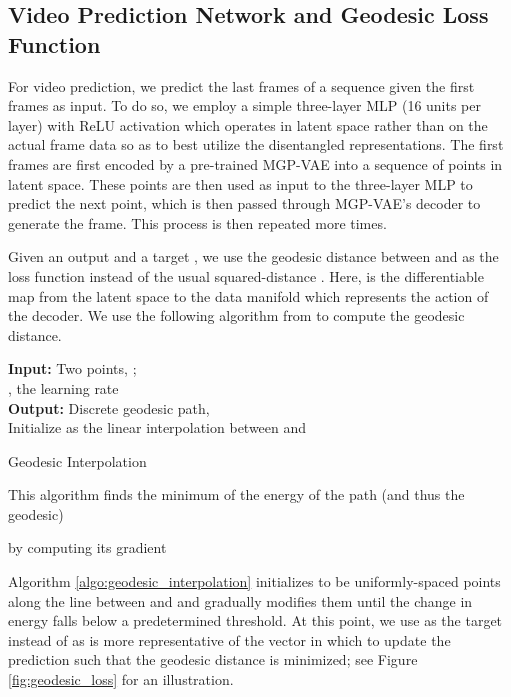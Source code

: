 \documentclass[runningheads]{llncs}
\begin{document}
   \subsection{Video Prediction Network and Geodesic Loss Function} 

   For video prediction, we predict the last  frames of a sequence given the first  frames as input. To do so, we employ a simple three-layer MLP (16 units per layer) with ReLU activation which operates in latent space rather than on the actual frame data so as to best utilize the disentangled representations. The first  frames are first encoded by a pre-trained MGP-VAE into a sequence of points in latent space. These points are then used as input to the three-layer MLP to predict the next point, which is then passed through MGP-VAE's decoder to generate the frame. This process is then repeated  more times. \par 
   
	Given an output  and a target , we use the geodesic distance between  and  as the loss function instead of the usual squared-distance . Here,  is the differentiable map from the latent space to the data manifold  which represents the action of the decoder. We use the following algorithm from \cite{Shao2017TheRG} to compute the geodesic distance.
   
   \begin{algorithm} [H]
      \SetAlgoLined
      \textbf{Input: } Two points, ; \\
      , the learning rate \\
      \textbf{Output: } Discrete geodesic path,  \\
      Initialize  as the linear interpolation between  and   \\
      \While{}
      {
      }
      \caption{Geodesic Interpolation}
      \label{algo:geodesic_interpolation}
   \end{algorithm}

   This algorithm finds the minimum of the energy of the path (and thus the geodesic)
   
   by computing its gradient
   

	Algorithm \ref{algo:geodesic_interpolation} initializes  to be uniformly-spaced points along the line between  and  and gradually modifies them until the change in energy falls below a predetermined threshold. At this point, we use  as the target instead of  as  is more representative of the vector in which to update the prediction  such that the geodesic distance is minimized; see Figure \ref{fig:geodesic_loss} for an illustration. \par
    
\end{document}
